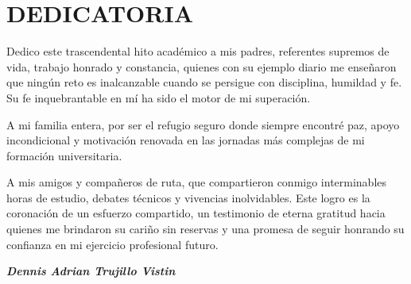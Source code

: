 
\pagestyle{empty}
\onehalfspacing
\fontsize{12}{18}\selectfont

\section*{DEDICATORIA}

\vspace{1.5cm}

Dedico este trascendental hito académico a mis padres, referentes supremos de vida, trabajo honrado y constancia, quienes con su ejemplo diario me enseñaron que ningún reto es inalcanzable cuando se persigue con disciplina, humildad y fe. Su fe inquebrantable en mí ha sido el motor de mi superación.

A mi familia entera, por ser el refugio seguro donde siempre encontré paz, apoyo incondicional y motivación renovada en las jornadas más complejas de mi formación universitaria.

A mis amigos y compañeros de ruta, que compartieron conmigo interminables horas de estudio, debates técnicos y vivencias inolvidables. Este logro es la coronación de un esfuerzo compartido, un testimonio de eterna gratitud hacia quienes me brindaron su cariño sin reservas y una promesa de seguir honrando su confianza en mi ejercicio profesional futuro.

\vspace{2.5cm}

\begin{flushright}
\itshape
\textbf{Dennis Adrian Trujillo Vistin}
\end{flushright}

\newpage
